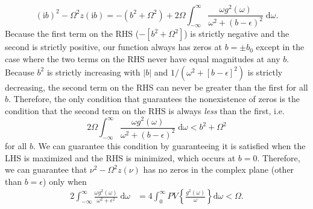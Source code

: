 \begin{itemize}
{    \begin{equation}
    (\mathrm{i}b)^2 - \Omega^2z(\mathrm{i}b) = -(b^2 + \Omega^2) + 2\Omega\int_{-\infty}^\infty \frac{\omega g^2(\omega)}{\omega^2 + (b - \epsilon)^2}\;\mathrm{d}\omega.
    \end{equation}
    Because the first term on the RHS ($-[b^2 + \Omega^2]$) is strictly negative and the second is strictly positive, our function always has zeros at $b = \pm b_0$ except in the case where the two terms on the RHS never have equal magnitudes at any $b$. Because $b^2$ is strictly increasing with $|b|$ and $1/(\omega^2 + [b - \epsilon]^2)$ is strictly decreasing, the second term on the RHS can never be greater than the first for all $b$. Therefore, the only condition that guarantees the nonexistence of zeros is the condition that the second term on the RHS is always \textit{less} than the first, i.e.
    \begin{equation}
    2\Omega\int_{-\infty}^\infty\frac{\omega g^2(\omega)}{\omega^2 + (b - \epsilon)^2}\;\mathrm{d}\omega < b^2 + \Omega^2
    \end{equation}
    for all $b$. We can guarantee this condition by guaranteeing it is satisfied when the LHS is maximized and the RHS is minimized, which occurs at $b = 0$. Therefore, we can guarantee that $\nu^2 - \Omega^2z(\nu)$ has no zeros in the complex plane (other than $b = \epsilon$) only when 
    \begin{equation}\label{eq:consistencyCondition1}
    \begin{split}
    2\int_{-\infty}^\infty \frac{\omega g^2(\omega)}{\omega^2 + \epsilon^2}\;\mathrm{d}\omega &= 4\int_0^\infty PV\left\{\frac{g^2(\omega)}{\omega}\right\}\mathrm{d}\omega < \Omega.
    \end{split}
    \end{equation}
    }
\end{itemize}

